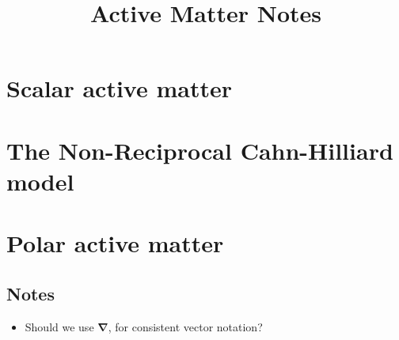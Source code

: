 \documentclass[10pt, a4paper, oneside]{book}
\title{Active Matter Notes}
\begin{document}
    \maketitle
    \clearpage


    \tableofcontents
    \clearpage

    \setlength{\parindent}{0em}
    \setlength{\parskip}{0.8em}


    

    \chapter{Scalar active matter}
    

    \chapter{The Non-Reciprocal Cahn-Hilliard model}
    

    \chapter{Polar active matter}
    


    
    

    
    \setcounter{tocdepth}{1}
    \listoftodos
    
    \section*{Notes}
    \begin{itemize}
        \item Should we use $\bm \nabla$, for consistent vector notation?
    \end{itemize}
\end{document}
